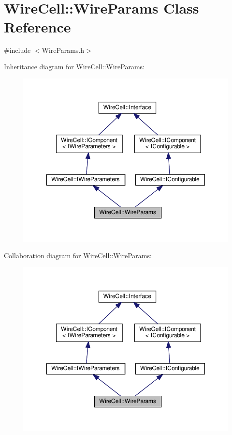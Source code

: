 \hypertarget{class_wire_cell_1_1_wire_params}{}\section{Wire\+Cell\+:\+:Wire\+Params Class Reference}
\label{class_wire_cell_1_1_wire_params}


{\ttfamily \#include $<$Wire\+Params.\+h$>$}



Inheritance diagram for Wire\+Cell\+:\+:Wire\+Params\+:
\nopagebreak
\begin{figure}[H]
\begin{center}
\leavevmode
\includegraphics[width=350pt]{class_wire_cell_1_1_wire_params__inherit__graph}
\end{center}
\end{figure}


Collaboration diagram for Wire\+Cell\+:\+:Wire\+Params\+:
\nopagebreak
\begin{figure}[H]
\begin{center}
\leavevmode
\includegraphics[width=350pt]{class_wire_cell_1_1_wire_params__coll__graph}
\end{center}
\end{figure}
